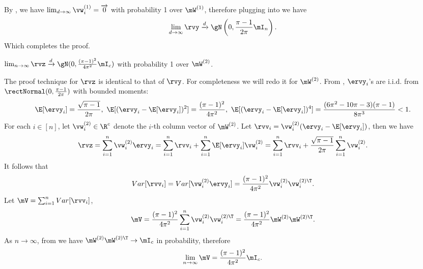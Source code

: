 \begin{proofof}{}
By , we have $\lim_{d\to\infty}\vw_i^{(1)} = \overrightarrow{0}$ with probability 1 over $\mW^{(1)}$, therefore plugging  into  we have\begin{equation}
    \lim_{d\to\infty} \rvy\xrightarrow{d}\gN\left(0,\frac{\pi-1}{2\pi}\mI_n\right).
\end{equation}
Which completes the proof.
\end{proofof}


\begin{lemma}
\label{lemma:z-gaussian}
$\lim_{n\to\infty}\rvz\xrightarrow{d} \gN(0, \frac{(\pi-1)^2}{4\pi^2}\mI_c)$ with probability 1 over $\mW^{(2)}$.
\end{lemma}

\begin{proofof}{}
The proof technique for $\rvz$ is identical to that of $\rvy$. For completeness we will redo it for $\mW^{(2)}$.
From , $\ervy_i$'s are i.i.d. from $\rectNormal(0,\frac{\pi-1}{2\pi})$ with bounded moments:
\begin{equation}
    \E[\ervy_i] = \frac{\sqrt{\pi-1}}{2\pi},\ 
    \E[(\ervy_i - \E[\ervy_i])^2] = \frac{(\pi-1)^2}{4\pi^2},\ \E[(\ervy_i - \E[\ervy_i])^4] = \frac{(6\pi^2-10\pi-3)(\pi-1)}{8\pi^3} < 1.
\end{equation}
For each $i\in[n]$, let $\vw_i^{(2)}\in\R^c$ denote the $i$-th column vector of $\mW^{(2)}$. Let 
$\rvv_i = \vw_i^{(2)}(\ervy_i - \E[\ervy_i])$,
then we have \begin{equation}
\label{eqn:z-expression}
    \rvz = \sum_{i=1}^n\vw_i^{(2)}\ervy_i = \sum_{i=1}^n\rvv_i + \sum_{i=1}^n\E[\ervy_i]\vw_i^{(2)} = \sum_{i=1}^n\rvv_i + \frac{\sqrt{\pi-1}}{2\pi}\sum_{i=1}^n\vw_i^{(2)}.
\end{equation}
It follows that 
\begin{equation}
   Var[\rvv_i] = Var[\vw_i^{(2)}\ervy_i] = \frac{(\pi-1)^2}{4\pi^2}\vw_i^{(2)}\vw_i^{(2)\T}.
\end{equation}
Let $\mV = \sum_{i=1}^n Var[\rvv_i]$,
\begin{equation}
    \mV = \frac{(\pi-1)^2}{4\pi^2}\sum_{i=1}^n\vw_i^{(2)}\vw_i^{(2)\T} = \frac{(\pi-1)^2}{4\pi^2}\mW^{(2)}\mW^{(2)\T}.
\end{equation}
As $n\to\infty$, from  we have $\mW^{(2)}\mW^{(2)\T}\to \mI_c$ in probability, therefore
\begin{equation}
\lim_{n\to\infty}\mV = \frac{(\pi-1)^2}{4\pi^2}\mI_c.
\end{equation}


\end{proofof}
